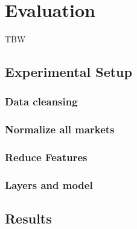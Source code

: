 

    
    


    
    
\chapter{Evaluation}\label{ch:evaluation}\glsresetall
TBW
\section{Experimental Setup}



\subsection{Data cleansing}

\subsection{Normalize all markets}

\subsection{Reduce Features}

\subsection{Layers and model}

\section{Results}
